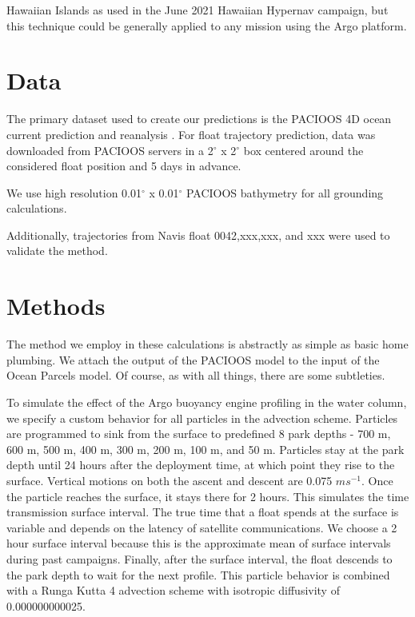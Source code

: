 \documentclass{ametsocV5}
\begin{document}
Hawaiian Islands as used in the June 2021 Hawaiian Hypernav campaign, but this technique could be generally applied to any mission using the Argo platform. %

\section{Data}
The primary dataset used to create our predictions is the PACIOOS 4D ocean current prediction \citep{PacIOOS} and reanalysis \cite{partridge2019reanalysis}.
For float trajectory prediction, data was downloaded from PACIOOS servers in a 2$^\circ$ x 2$^\circ$ box centered around the considered float position and 5 days in advance. 

We use high resolution 0.01$^\circ$ x 0.01$^\circ$ PACIOOS bathymetry for all grounding calculations.

Additionally, trajectories from Navis float 0042,xxx,xxx, and xxx %
were used to validate the method. 


\section{Methods}
The method we employ in these calculations is abstractly as simple as basic home plumbing. We attach the output of the PACIOOS model to the input of the Ocean Parcels model. Of course, as with all things, there are some subtleties. 

To simulate the effect of the Argo buoyancy engine profiling in the water column, we specify a custom behavior for all particles in the advection scheme. Particles are programmed to sink from the surface to predefined 8 park depths - 700 m, 600 m, 500 m, 400 m, 300 m, 200 m, 100 m, and 50 m. Particles stay at the park depth until 24 hours after the deployment time, at which point they rise to the surface. Vertical motions on both the ascent and descent are 0.075 $m s^{-1}$. Once the particle reaches the surface, it stays there for 2 hours. This simulates the time transmission surface interval. The true time that a float spends at the surface is variable and depends on the latency of satellite communications. We choose a 2 hour surface interval because this is the approximate mean of surface intervals during past campaigns. Finally, after the surface interval, the float descends to the park depth to wait for the next profile. This particle behavior is combined with a Runga Kutta 4 advection scheme with isotropic diffusivity of 0.000000000025. 
\end{document}
